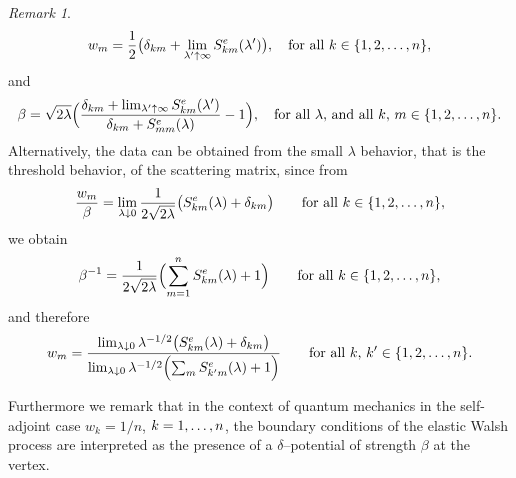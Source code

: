 \documentclass[11pt,a4paper]{amsart}
\newcommand{\gb}{\beta}
\newcommand{\gd}{\delta}
\newcommand{\gl}{\lambda}
\newcommand{\1}{1}
\theoremstyle{remark}
\newtheorem{remark}[theorem]{Remark}
\newcommand{\sgl}{\ensuremath\sqrt{2\gl}}
\newcommand{\sn}{\ensuremath\{1,2,\dotsc,n\}}
\newcommand{\da}{\ensuremath\downarrow}
\newcommand{\ua}{\ensuremath\uparrow}
\newcommand{\kn}{\ensuremath k=1,\dotsc,n}
\newcommand{\SeW}{\ensuremath S^e}
\numberwithin{equation}{section}
\begin{document}
\begin{remark}
\begin{equation*}
    w_m = \frac{1}{2}\bigl(\gd_{km} + \lim_{\gl'\ua\infty} \SeW_{km}(\gl')\bigr),
            \quad \text{for all $k\in\sn$},
\end{equation*}
and
\begin{equation*}
    \gb = \sgl\Bigl(\frac{\gd_{km}+\lim_{\gl'\ua\infty}\SeW_{km}(\gl')}
            {\gd_{km}+\SeW_{mm}(\gl)}-1\Bigr),\quad \text{for all $\gl$, and all $k$, $m\in\sn$}.
\end{equation*}
Alternatively, the data can be obtained from the small $\gl$ behavior, that is the
threshold behavior, of the scattering matrix, since from
\begin{equation*}
    \frac{w_m}{\gb}
        = \lim_{\gl \da 0} \frac{1}{2\sgl}\bigl(\SeW_{km}(\gl)+\gd_{km}\bigr)
            \qquad \text{for all $k\in\sn$},
\end{equation*}
we obtain
\begin{equation*}
    \gb^{-1} = \frac{1}{2\sgl}\Bigl(\sum_{m=1}^n\SeW_{km}(\gl)+1\Bigr)
            \qquad \text{for all $k\in\sn$},
\end{equation*}
and therefore
\begin{equation*}
    w_m = \frac{\lim_{\gl\da 0} \gl^{-1/2}\bigl(\SeW_{km}(\gl)+\gd_{km}\bigr)}
            {\lim_{\gl\da 0} \gl^{-1/2}\Bigl(\sum_m\SeW_{k'm}(\gl)+1\Bigr)}
            \qquad \text{for all $k$, $k'\in\sn$}.
\end{equation*}

Furthermore we remark that in the context of quantum mechanics in the self-adjoint
case $w_k=1/n$, $\kn$, the boundary conditions of the elastic Walsh process are
interpreted as the presence of a $\gd$--potential of strength $\gb$ at the vertex.
\end{remark}
\end{document}

